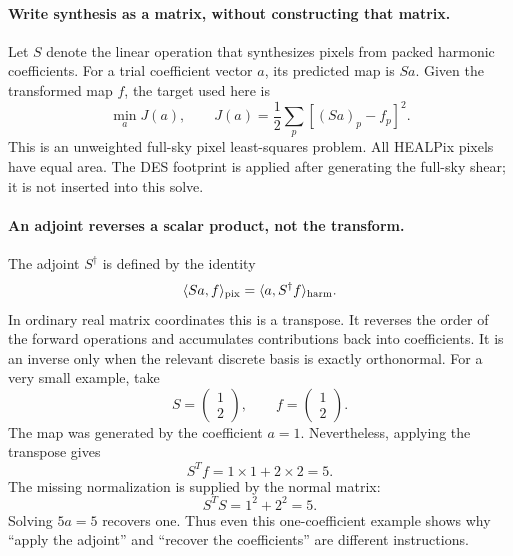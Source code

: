 \paragraph{Write synthesis as a matrix, without constructing that matrix.}
Let $S$ denote the linear operation that synthesizes pixels from packed
harmonic coefficients. For a trial coefficient vector $a$, its predicted
map is $Sa$. Given the transformed map $f$, the target used here is
\begin{equation}
 \min_a J(a),\qquad J(a)=\frac12\sum_p[(Sa)_p-f_p]^2.
\end{equation}
This is an unweighted full-sky pixel least-squares problem. All HEALPix
pixels have equal area. The DES footprint is applied after generating the
full-sky shear; it is not inserted into this solve.

\paragraph{An adjoint reverses a scalar product, not the transform.}
The adjoint $S^\dagger$ is defined by the identity
\begin{equation}
 \langle Sa,f\rangle_{\rm pix}=\langle a,S^\dagger f\rangle_{\rm harm}.
\end{equation}
In ordinary real matrix coordinates this is a transpose. It reverses the
order of the forward operations and accumulates contributions back into
coefficients. It is an inverse only when the relevant discrete basis is
exactly orthonormal. For a very small example, take
\begin{equation}
 S=\begin{pmatrix}1\\2\end{pmatrix},\qquad
 f=\begin{pmatrix}1\\2\end{pmatrix}.
\end{equation}
The map was generated by the coefficient $a=1$. Nevertheless, applying the
transpose gives
\begin{equation}
 S^T f=1\times1+2\times2=5.
\end{equation}
The missing normalization is supplied by the normal matrix:
\begin{equation}
 S^TS=1^2+2^2=5.
\end{equation}
Solving $5a=5$ recovers one. Thus even this one-coefficient example shows
why ``apply the adjoint'' and ``recover the coefficients'' are different
instructions.

